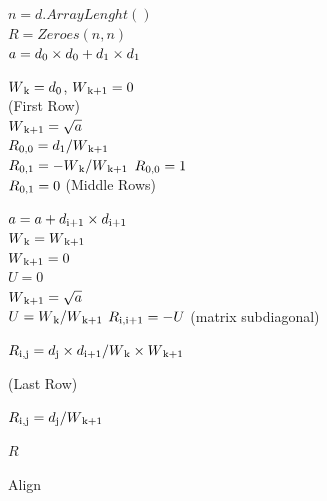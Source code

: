 \documentclass[a4paper,twoside]{bth}
\begin{document}
\begin{algorithm}[H]
 $n = d.ArrayLenght()$\\
 $R = Zeroes(n, n)$\\
 
 $a = d\textsubscript{0}\times d\textsubscript{0} + d\textsubscript{1}\times d\textsubscript{1}$
 
 
 $W\textsubscript{k} = d\textsubscript{0}$,
 $W\textsubscript{k+1} = 0$ \\
 {
 (First Row)
 }\\
 {
 $W\textsubscript{k+1} = \sqrt{a}$ \\
 $R\textsubscript{0,0} = d\textsubscript{1} / W\textsubscript{k+1}$  \\
 $R\textsubscript{0,1} = -W\textsubscript{k} / W\textsubscript{k+1}$ 
 }
 \Else
 {
 $R\textsubscript{0,0} = 1$\\
 $R\textsubscript{0,1} = 0$
 } 
 {
(Middle Rows)
}\\
 {
    $a = a + d\textsubscript{i+1} \times d\textsubscript{i+1}$ \\
    $W\textsubscript{k} = W\textsubscript{k+1}$ \\
    $W\textsubscript{k+1} = 0$ \\
    
    $U = 0$\\
    {
     $W\textsubscript{k+1} = \sqrt{a}$ \\
     $U = W\textsubscript{k} / W\textsubscript{k+1}$
    }
     $R\textsubscript{i,i+1} = -U$ (matrix subdiagonal)\\
     
    {
        {
         $R\textsubscript{i,j} = d\textsubscript{j} \times d\textsubscript{i+1} / W\textsubscript{k} \times W\textsubscript{k+1}$
        }
     
    }
 }
 {
 (Last Row)
 }\\
 {
    {
     $R\textsubscript{i,j} = d\textsubscript{j}/ W\textsubscript{k+1}$
    }
 
 }
 \Return $R$
 \caption{Align}
 \label{al:align}
\end{algorithm}
\end{document}
